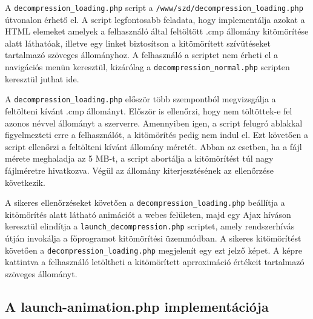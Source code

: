\documentclass[oneside,titlepage,12pt,a4paper]{report}
\begin{document}
A \texttt{decompression\_loading.php} script a \texttt{/www/szd/decompression\_loading.php} útvonalon érhető el. A script legfontosabb feladata, hogy implementálja azokat a HTML elemeket amelyek a felhasználó által feltöltött .cmp állomány kitömörítése alatt láthatóak, illetve egy linket biztosítson a kitömörített szívütéseket tartalmazó szöveges állományhoz. A felhasználó a scriptet nem érheti el a navigációs menün keresztül, kizárólag a \texttt{decompression\_normal.php} scripten keresztül juthat ide. 
\par A \texttt{decompression\_loading.php} először több szempontból megvizsgálja a feltölteni kívánt .cmp állományt. Először is ellenőrzi, hogy nem töltöttek-e fel azonos névvel állományt a szerverre. Amennyiben igen, a script felugró ablakkal figyelmezteti erre a felhasználót, a kitömörítés pedig nem indul el. Ezt követően a script ellenőrzi a feltölteni kívánt állomány méretét. Abban az esetben, ha a fájl mérete meghaladja az 5 MB-t, a script abortálja a kitömörítést túl nagy fájlméretre hivatkozva. Végül az állomány kiterjesztésének az ellenőrzése következik.
\par A sikeres ellenőrzéseket követően a \texttt{decompression\_loading.php} beállítja a kitömörítés alatt látható animációt a webes felületen, majd egy Ajax híváson keresztül elindítja a \texttt{launch\_decompression.php} scriptet, amely rendszerhívás útján invokálja a főprogramot kitömörítési üzemmódban. A sikeres kitömörítést követően a \texttt{decompression\_loading.php} megjelenít egy ezt jelző képet. A képre kattintva a felhasználó letöltheti a kitömörített aprroximáció értékeit tartalmazó szöveges állományt. 

\subsection{A launch-animation.php implementációja}
\end{document}
